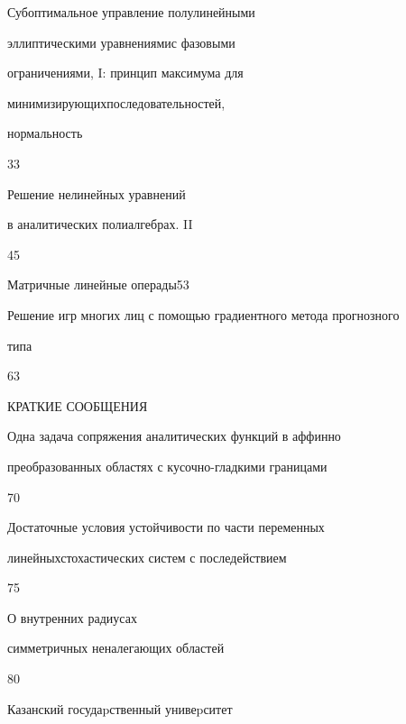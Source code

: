 

{Субоптимальное управление полулинейными  


эллиптическими уравнениями\newline с фазовыми  


ограничениями, I: принцип максимума для 


минимизирующих\newline последовательностей, 


нормальность}{33}




{Решение нелинейных уравнений 


в аналитических полиалгебрах. II\ }{45}




{Матричные линейные операды}{53}




{Решение игр многих лиц с помощью градиентного метода прогнозного \newline


типа}{63}


\bigskip


\bigskip





\centerline{КРАТКИЕ СООБЩЕНИЯ}





\bigskip


\bigskip







{Одна задача сопряжения аналитических функций в аффинно \newline


преобразованных областях с кусочно-гладкими границами}{70}




{Достаточные условия устойчивости по части переменных


линейных\newline стохастических систем с последействием}{75}




{О внутренних радиусах


симметричных неналегающих областей}{80}








\vfill


\noindent\raisebox{2pt}{\copyright} Казанский госудаpственный унивеpситет





